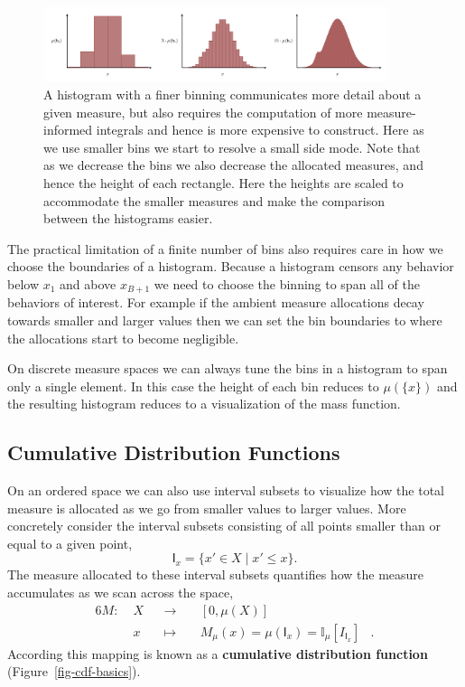 \documentclass[
  letterpaper,
  DIV=11,
  numbers=noendperiod]{scrartcl}
\begin{document}
\begin{figure}

{\centering \includegraphics[width=0.9\textwidth,height=\textheight]{figures/histograms/varying_binning/varying_binning.pdf}

}

\caption{\label{fig-hist-binning}A histogram with a finer binning
communicates more detail about a given measure, but also requires the
computation of more measure-informed integrals and hence is more
expensive to construct. Here as we use smaller bins we start to resolve
a small side mode. Note that as we decrease the bins we also decrease
the allocated measures, and hence the height of each rectangle. Here the
heights are scaled to accommodate the smaller measures and make the
comparison between the histograms easier.}

\end{figure}

The practical limitation of a finite number of bins also requires care
in how we choose the boundaries of a histogram. Because a histogram
censors any behavior below \(x_{1}\) and above \(x_{B + 1}\) we need to
choose the binning to span all of the behaviors of interest. For example
if the ambient measure allocations decay towards smaller and larger
values then we can set the bin boundaries to where the allocations start
to become negligible.

On discrete measure spaces we can always tune the bins in a histogram to
span only a single element. In this case the height of each bin reduces
to \(\mu( \{ x \} )\) and the resulting histogram reduces to a
visualization of the mass function.

\hypertarget{cumulative-distribution-functions}{%
\subsection{Cumulative Distribution
Functions}\label{cumulative-distribution-functions}}

On an ordered space we can also use interval subsets to visualize how
the total measure is allocated as we go from smaller values to larger
values. More concretely consider the interval subsets consisting of all
points smaller than or equal to a given point, \[
\mathsf{I}_{x} = \{ x' \in X \mid x' \le x \}.
\] The measure allocated to these interval subsets quantifies how the
measure accumulates as we scan across the space, \begin{alignat*}{6}
M :\; & X & &\rightarrow& \; &[0, \mu(X)]&
\\
& x & &\mapsto& & M_{\mu}(x) = \mu(\mathsf{I}_{x}) = \mathbb{I}_{\mu}[I_{\mathsf{I}_{x}}] &.
\end{alignat*} According this mapping is known as a \textbf{cumulative
distribution function} (Figure~\ref{fig-cdf-basics}).
\end{document}
